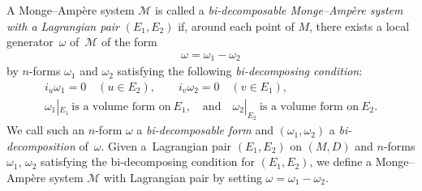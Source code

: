 \documentclass[11pt]{article}
\begin{document}
\begin{Def}
A Monge--Amp{\`e}re system $\mathcal{M}$ is called
a {\it bi-decomposable Monge--Amp{\`e}re system with a Lagrangian pair} $(E_1,E_2)$
if, around each point of $M$, there exists a local generator~$\omega$
of~$\mathcal{M}$
of the form
\begin{gather*}
\omega=\omega_1-\omega_2
\end{gather*}
by $n$-forms $\omega_1$ and $\omega_2$
satisfying the following {\it bi-decomposing condition}:
\begin{gather*}
i_u\omega_1=0\quad (u\in E_2),\qquad i_v\omega_2=0\quad (v\in E_1),
\\
\omega_1| _{E_1}\ \text{is a volume form on}\ E_1,\quad
\mathrm{and}\quad \omega_2| _{E_2}\ \text{is a volume form on}\ E_2.
\end{gather*}
We call such an $n$-form $\omega$ a {\it bi-decomposable form} and
$(\omega_1, \omega_2)$ a {\it bi-decomposition} of~$\omega$.
Given a~Lagrangian pair $(E_1,E_2)$ on $(M, D)$ and $n$-forms $\omega_1$,
$\omega_2$ satisfying the bi-decomposing condition for $(E_1,E_2)$,
we def\/ine a Monge--Amp{\`e}re system
${\mathcal M}$ with Lagrangian pair
by setting $\omega = \omega_1-\omega_2$.
\end{Def}
\end{document}
